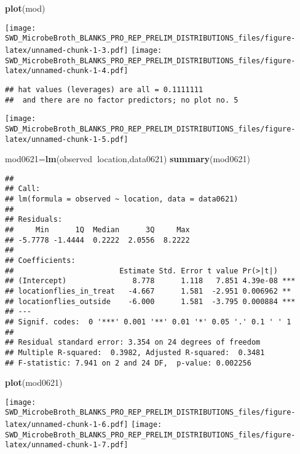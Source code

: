 \documentclass[]{article}
\newenvironment{Shaded}{\begin{snugshade}}{\end{snugshade}}
\newcommand{\KeywordTok}[1]{\textcolor[rgb]{0.13,0.29,0.53}{\textbf{#1}}}
\newcommand{\OperatorTok}[1]{\textcolor[rgb]{0.81,0.36,0.00}{\textbf{#1}}}
\newcommand{\NormalTok}[1]{#1}
\begin{document}
\begin{Shaded}
\begin{Highlighting}[]
\KeywordTok{plot}\NormalTok{(mod)}
\end{Highlighting}
\end{Shaded}

\texttt{[image: SWD\_MicrobeBroth\_BLANKS\_PRO\_REP\_PRELIM\_DISTRIBUTIONS\_files/figure-latex/unnamed-chunk-1-3.pdf]}
\texttt{[image: SWD\_MicrobeBroth\_BLANKS\_PRO\_REP\_PRELIM\_DISTRIBUTIONS\_files/figure-latex/unnamed-chunk-1-4.pdf]}

\begin{verbatim}
## hat values (leverages) are all = 0.1111111
##  and there are no factor predictors; no plot no. 5
\end{verbatim}

\texttt{[image: SWD\_MicrobeBroth\_BLANKS\_PRO\_REP\_PRELIM\_DISTRIBUTIONS\_files/figure-latex/unnamed-chunk-1-5.pdf]}

\begin{Shaded}
\begin{Highlighting}[]
\NormalTok{mod0621=}\KeywordTok{lm}\NormalTok{(observed}\OperatorTok{~}\NormalTok{location,data0621)}
\KeywordTok{summary}\NormalTok{(mod0621)}
\end{Highlighting}
\end{Shaded}

\begin{verbatim}
## 
## Call:
## lm(formula = observed ~ location, data = data0621)
## 
## Residuals:
##     Min      1Q  Median      3Q     Max 
## -5.7778 -1.4444  0.2222  2.0556  8.2222 
## 
## Coefficients:
##                        Estimate Std. Error t value Pr(>|t|)    
## (Intercept)               8.778      1.118   7.851 4.39e-08 ***
## locationflies_in_treat   -4.667      1.581  -2.951 0.006962 ** 
## locationflies_outside    -6.000      1.581  -3.795 0.000884 ***
## ---
## Signif. codes:  0 '***' 0.001 '**' 0.01 '*' 0.05 '.' 0.1 ' ' 1
## 
## Residual standard error: 3.354 on 24 degrees of freedom
## Multiple R-squared:  0.3982, Adjusted R-squared:  0.3481 
## F-statistic: 7.941 on 2 and 24 DF,  p-value: 0.002256
\end{verbatim}

\begin{Shaded}
\begin{Highlighting}[]
\KeywordTok{plot}\NormalTok{(mod0621)}
\end{Highlighting}
\end{Shaded}

\texttt{[image: SWD\_MicrobeBroth\_BLANKS\_PRO\_REP\_PRELIM\_DISTRIBUTIONS\_files/figure-latex/unnamed-chunk-1-6.pdf]}
\texttt{[image: SWD\_MicrobeBroth\_BLANKS\_PRO\_REP\_PRELIM\_DISTRIBUTIONS\_files/figure-latex/unnamed-chunk-1-7.pdf]}
\end{document}
